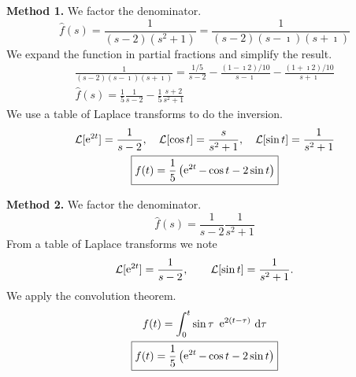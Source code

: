 {%
\begin{Solution}
  \label{solution L(1/(s3-2s2+s-2))}
  \textbf{Method 1.}
  We factor the denominator.
  \[ 
  \hat{f}(s) = \frac{1}{(s-2)(s^2+1)} = \frac{1}{(s-2)(s-\imath)(s+\imath)}
  \]
  We expand the function in partial fractions and simplify the result.
  \begin{gather*}
    \frac{1}{(s-2)(s-\imath)(s+\imath)} 
    = \frac{1/5}{s-2} 
    - \frac{(1 - \imath 2)/10}{s - \imath}
    - \frac{(1 + \imath 2)/10}{s + \imath} \\
    \hat{f}(s) = \frac{1}{5} \frac{1}{s-2} - \frac{1}{5} \frac{s+2}{s^2+1} 
  \end{gather*}
  We use a table of Laplace transforms to do the inversion.
  \begin{gather*}
    \mathcal{L} [\mathop{\mathrm{e}}\nolimits^{2t}] = \frac{1}{s-2}, \quad
    \mathcal{L}[\cos t] =  \frac{s}{s^2+1}, \quad
    \mathcal{L}[\sin t] =  \frac{1}{s^2+1} \\
    \boxed{ 
      f(t) = \frac{1}{5} \left( \mathop{\mathrm{e}}\nolimits^{2t} - \cos t - 2 \sin t \right)
      }
  \end{gather*}

  \textbf{Method 2.}
  We factor the denominator.
  \[ 
  \hat{f}(s) = \frac{1}{s-2} \frac{1}{s^2+1} 
  \]
  From a table of Laplace transforms we note
  \[ 
  \mathcal{L} [\mathop{\mathrm{e}}\nolimits^{2t} ] = \frac{1}{s-2}, \qquad
  \mathcal{L}[\sin t] = \frac{1}{s^2+1}. 
  \]
  We apply the convolution theorem.
  \begin{gather*}
    f(t) = \int_0^t \sin \tau \ \mathop{\mathrm{e}}\nolimits^{2(t-\tau)} \,\mathrm{d} \tau \\
    \boxed{ 
      f(t) = \frac{1}{5} \left( \mathop{\mathrm{e}}\nolimits^{2t} - \cos t - 2 \sin t \right)
      }
  \end{gather*}


\end{Solution}}
